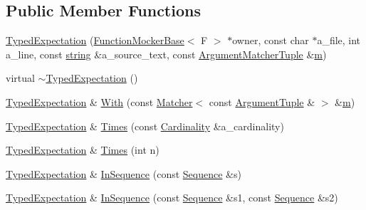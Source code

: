 \subsection*{Public Member Functions}
\begin{DoxyCompactItemize}
\item 
\hyperlink{classtesting_1_1internal_1_1_typed_expectation_a10bd0a8fa0db37215be42e1c61ccbc28}{Typed\+Expectation} (\hyperlink{classtesting_1_1internal_1_1_function_mocker_base}{Function\+Mocker\+Base}$<$ F $>$ $\ast$owner, const char $\ast$a\+\_\+file, int a\+\_\+line, const \hyperlink{namespacetesting_1_1internal_a8e8ff5b11e64078831112677156cb111}{string} \&a\+\_\+source\+\_\+text, const \hyperlink{classtesting_1_1internal_1_1_typed_expectation_a8f10e3906761cc5c10fa3561c6e8938e}{Argument\+Matcher\+Tuple} \&\hyperlink{variables__e_8js_aab4247b6acebcba996939b177f483c14}{m})
\item 
virtual \hyperlink{classtesting_1_1internal_1_1_typed_expectation_a4d73d7edd81f1b1418a33931fe728158}{$\sim$\+Typed\+Expectation} ()
\item 
\hyperlink{classtesting_1_1internal_1_1_typed_expectation}{Typed\+Expectation} \& \hyperlink{classtesting_1_1internal_1_1_typed_expectation_a4b25ec3d051e8551f3e213214b31c714}{With} (const \hyperlink{classtesting_1_1_matcher}{Matcher}$<$ const \hyperlink{classtesting_1_1internal_1_1_typed_expectation_a9a91379262d101f435809ba4556d14fa}{Argument\+Tuple} \& $>$ \&\hyperlink{variables__e_8js_aab4247b6acebcba996939b177f483c14}{m})
\item 
\hyperlink{classtesting_1_1internal_1_1_typed_expectation}{Typed\+Expectation} \& \hyperlink{classtesting_1_1internal_1_1_typed_expectation_a9a4c34ee5c6e6adc880a22f61f33da57}{Times} (const \hyperlink{classtesting_1_1_cardinality}{Cardinality} \&a\+\_\+cardinality)
\item 
\hyperlink{classtesting_1_1internal_1_1_typed_expectation}{Typed\+Expectation} \& \hyperlink{classtesting_1_1internal_1_1_typed_expectation_a92d56ee785d38ec8193aed2a0fcbccf0}{Times} (int n)
\item 
\hyperlink{classtesting_1_1internal_1_1_typed_expectation}{Typed\+Expectation} \& \hyperlink{classtesting_1_1internal_1_1_typed_expectation_ada9e9081a98435991310ac60483d1230}{In\+Sequence} (const \hyperlink{classtesting_1_1_sequence}{Sequence} \&s)
\item 
\hyperlink{classtesting_1_1internal_1_1_typed_expectation}{Typed\+Expectation} \& \hyperlink{classtesting_1_1internal_1_1_typed_expectation_ac0f45c73e3f816796f6c5dea2dc70131}{In\+Sequence} (const \hyperlink{classtesting_1_1_sequence}{Sequence} \&s1, const \hyperlink{classtesting_1_1_sequence}{Sequence} \&s2)

\end{DoxyCompactItemize}

